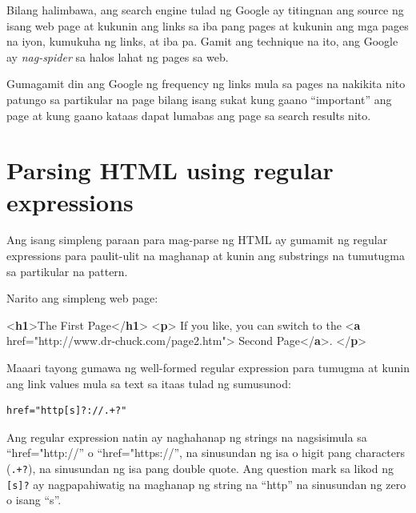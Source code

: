 \documentclass[10pt,]{book}
\newenvironment{Shaded}{}{}
\newcommand{\DataTypeTok}[1]{\textcolor[rgb]{0.56,0.13,0.00}{#1}}
\newcommand{\KeywordTok}[1]{\textcolor[rgb]{0.00,0.44,0.13}{\textbf{#1}}}
\newcommand{\NormalTok}[1]{#1}
\newcommand{\OperatorTok}[1]{\textcolor[rgb]{0.40,0.40,0.40}{#1}}
\newcommand{\OtherTok}[1]{\textcolor[rgb]{0.00,0.44,0.13}{#1}}
\newcommand{\StringTok}[1]{\textcolor[rgb]{0.25,0.44,0.63}{#1}}
\begin{document}
Bilang halimbawa, ang search engine tulad ng Google ay titingnan ang
source ng isang web page at kukunin ang links sa iba pang pages at
kukunin ang mga pages na iyon, kumukuha ng links, at iba pa. Gamit ang
technique na ito, ang Google ay \emph{nag-spider} sa halos lahat ng
pages sa web.

Gumagamit din ang Google ng frequency ng links mula sa pages na nakikita
nito patungo sa partikular na page bilang isang sukat kung gaano
``important'' ang page at kung gaano kataas dapat lumabas ang page sa
search results nito.

\section{Parsing HTML using regular
expressions}\label{parsing-html-using-regular-expressions}

Ang isang simpleng paraan para mag-parse ng HTML ay gumamit ng regular
expressions para paulit-ulit na maghanap at kunin ang substrings na
tumutugma sa partikular na pattern.

Narito ang simpleng web page:

\begin{Shaded}
\begin{Highlighting}[]
\DataTypeTok{\textless{}}\KeywordTok{h1}\DataTypeTok{\textgreater{}}\NormalTok{The First Page}\DataTypeTok{\textless{}/}\KeywordTok{h1}\DataTypeTok{\textgreater{}}
\DataTypeTok{\textless{}}\KeywordTok{p}\DataTypeTok{\textgreater{}}
\NormalTok{If you like, you can switch to the}
\DataTypeTok{\textless{}}\KeywordTok{a}\OtherTok{ href}\OperatorTok{=}\StringTok{"http://www.dr{-}chuck.com/page2.htm"}\DataTypeTok{\textgreater{}}
\NormalTok{Second Page}\DataTypeTok{\textless{}/}\KeywordTok{a}\DataTypeTok{\textgreater{}}\NormalTok{.}
\DataTypeTok{\textless{}/}\KeywordTok{p}\DataTypeTok{\textgreater{}}
\end{Highlighting}
\end{Shaded}

Maaari tayong gumawa ng well-formed regular expression para tumugma at
kunin ang link values mula sa text sa itaas tulad ng sumusunod:

{\small
\begin{verbatim}
href="http[s]?://.+?"
\end{verbatim}
}

Ang regular expression natin ay naghahanap ng strings na nagsisimula sa
``href="http://'' o ``href="https://'', na sinusundan ng isa o higit
pang characters (\texttt{.+?}), na sinusundan ng isa pang double quote.
Ang question mark sa likod ng \texttt{{[}s{]}?} ay nagpapahiwatig na
maghanap ng string na ``http'' na sinusundan ng zero o isang ``s''.
\end{document}
